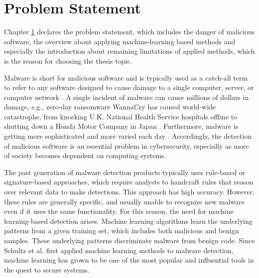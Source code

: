 
\chapter{Problem Statement}
\label{chap:problem-statement}
\graphicspath{{Chapter1/Figs/}}

\begin{chapabstract}
Chapter \ref{chap:problem-statement} declares the problem statement, which includes the danger of malicious software, the overview about applying machine-learning based methods and especially the introduction about remaining limitations of applied methods, which is the reason for choosing the thesis topic.
\end{chapabstract}
 
 Malware is short for malicious software and is typically used as a catch-all term to refer to any software designed to cause damage to a single computer, server, or computer network \cite{moir2003defining}.  A single incident of malware can cause millions of dollars in damage, e.g., zero-day ransomware WannaCry has caused world-wide catastrophe, from knocking U.K. National Health Service hospitals offline to shutting down a Honda Motor Company in Japan \cite{chen2017automated}. Furthermore, malware is getting more sophisticated and more varied each day \cite{shahi2009technology}. Accordingly, the detection of malicious software is an essential problem in cybersecurity, especially as more of society becomes dependent on computing systems.

The past generation of malware detection products typically uses rule-based or signature-based approaches, which require analysts to handcraft rules that reason over relevant data to make detections. This approach has high accuracy. However, these rules are generally specific, and usually unable to recognize new malware even if it uses the same functionality. For this reason, the need for machine learning-based detection arises. Machine learning algorithms learn the underlying patterns from a given training set, which includes both malicious and benign samples. These underlying patterns discriminate malware from benign code. Since Schultz et al. \cite{schultz2001data} first applied machine learning methods to malware detection, machine learning has grown to be one of the most popular and influential tools in the quest to secure systems. 


